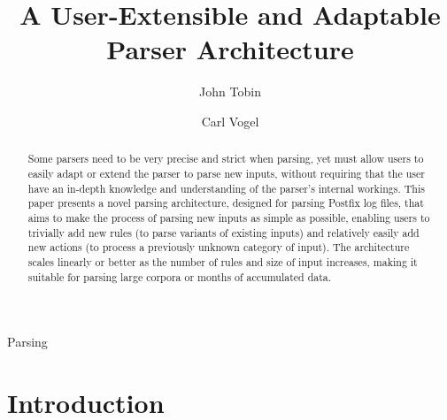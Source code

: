 \documentclass[preprint,draft,numbers]{elsarticle}
\begin{document}
\begin{frontmatter}

\title{A User-Extensible and Adaptable Parser Architecture}
\author{John Tobin}
\author{Carl Vogel}
\address{School of Computer Science and Statistics, Trinity College, Dublin
2, Ireland.}
\address{Supported by Science Foundation Ireland RFP 05/RF/CMS002.}

\begin{keyword}
    Parsing
\end{keyword}

\begin{abstract}
    Some parsers need to be very precise and strict when parsing, yet must
    allow users to easily adapt or extend the parser to parse new inputs,
    without requiring that the user have an in-depth knowledge and
    understanding of the parser's internal workings.  This paper presents a
    novel parsing architecture, designed for parsing Postfix log files,
    that aims to make the process of parsing new inputs as simple as
    possible, enabling users to trivially add new rules (to parse variants
    of existing inputs) and relatively easily add new actions (to process a
    previously unknown category of input).  The architecture scales
    linearly or better as the number of rules and size of input increases,
    making it suitable for parsing large corpora or months of accumulated
    data.
\end{abstract}

\end{frontmatter}



\section{Introduction}

\label{Introduction}
\end{document}
